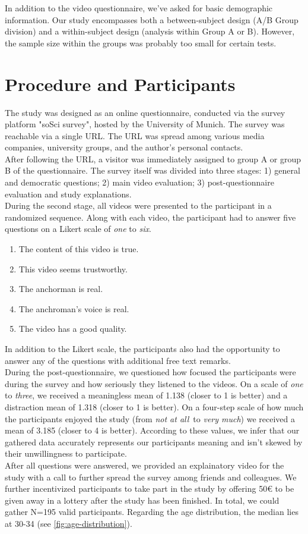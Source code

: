 \documentclass[
  a4paper,  %
  twoside,  %
  bibliography=totoc,
  headsepline,
  cleardoublepage=empty,
  parskip=half,
  draft=false
]{scrbook}
\begin{document}
In addition to the video questionnaire, we've asked for basic demographic information. Our study encompasses both a between-subject design (A/B Group division) and a within-subject design (analysis within Group A or B). However, the sample size within the groups was probably too small for certain tests.

\section{Procedure and Participants}
\label{sec:procedure-and-participants}

The study was designed as an online questionnaire, conducted via the survey platform "soSci survey", hosted by the University of Munich. The survey was reachable via a single URL. The URL was spread among various media companies, university groups, and the author's personal contacts. \\
After following the URL, a visitor was immediately assigned to group A or group B of the questionnaire. The survey itself was divided into three stages: 1) general and democratic questions; 2) main video evaluation; 3) post-questionnaire evaluation and study explanations. \\
During the second stage, all videos were presented to the participant in a randomized sequence. Along with each video, the participant had to answer five questions on a Likert scale of \textit{one} to \textit{six}.
\begin{enumerate}
  \item The content of this video is true.
  \item This video seems trustworthy.
  \item The anchorman is real.
  \item The anchroman's voice is real.
  \item The video has a good quality.
\end{enumerate}
In addition to the Likert scale, the participants also had the opportunity to answer any of the questions with additional free text remarks. \\
During the post-questionnaire, we questioned how focused the participants were during the survey and how seriously they listened to the videos. On a scale of \textit{one} to \textit{three}, we received a meaningless mean of 1.138 (closer to 1 is better) and a distraction mean of 1.318 (closer to 1 is better). On a four-step scale of how much the participants enjoyed the study (from \textit{not at all} to \textit{very much}) we received a mean of 3.185 (closer to 4 is better). According to these values, we infer that our gathered data accurately represents our participants meaning and isn't skewed by their unwillingness to participate. \\
After all questions were answered, we provided an explainatory video for the study with a call to further spread the survey among friends and colleagues. We further incentivized participants to take part in the study by offering 50€ to be given away in a lottery after the study has been finished.
In total, we could gather N=195 valid participants. Regarding the age distribution, the median lies at 30-34 (see \ref{fig:age-distribution}).
\end{document}

